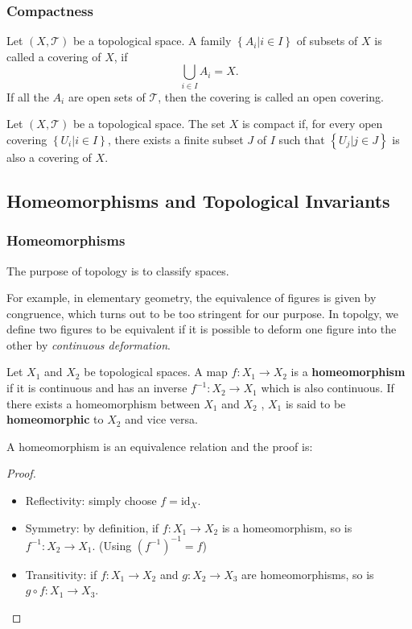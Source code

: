 \documentclass[10pt]{article}
\begin{document}
\subsubsection{Compactness}
\begin{definition}[Covering]
    Let $(X,\mathcal{T})$ be a topological space.
    A family $\left\{A_i\vert i\in I\right\}$ of subsets of $X$ is called a covering of $X$, if 
    \begin{equation}
        \bigcup_{i\in I} A_i=X.
    \end{equation}
    If all the $A_i$ are open sets of $\mathcal{T}$, then the covering is called an open covering.
\end{definition}

\begin{definition}[Compactness]
    Let $(X,\mathcal{T})$ be a topological space.
    The set $X$ is compact if, for every open covering $\left\{U_i\vert i\in I\right\}$, there exists a finite subset $J$ of $I$ such that $\left\{U_j\vert j\in J\right\}$ is also a covering of $X$.
\end{definition}

\subsection{Homeomorphisms and Topological Invariants}
\subsubsection{Homeomorphisms}
\begin{intu}
    The purpose of topology is to classify spaces.
\end{intu}

For example, in elementary geometry, the equivalence of figures is given by congruence, which turns out to be too stringent for our purpose.
In topolgy, we define two figures to be equivalent if it is possible to deform one figure into the other by \textit{continuous deformation}.
\begin{definition}[Homeomorphism]\label{homeomorphism}
    Let $X_1$ and $X_2$ be topological spaces.
    A map $f : X_{1}\to X_{2}$ is a \textbf{homeomorphism} if it is continuous and has an inverse $f^{-1}:X_{2}\to X_{1}$ which is also continuous.
    If there exists a homeomorphism between $X_1$ and $X_2$ , $X_1$ is said to be \textbf{homeomorphic} to $X_2$ and vice versa.
\end{definition}

A homeomorphism is an equivalence relation and the proof is:
\begin{proof}
    \begin{itemize}
        \item Reflectivity: simply choose $f=\text{id}_X$.
        \item Symmetry: by definition, if $f : X_1 \to X_2$ is a homeomorphism, so is $f^{-1} : X_2 \to X_1$. (Using $(f^{-1})^{-1}=f$)
        \item Transitivity: if $f : X_1 \to X_2$ and $g : X_2 \to X_3$ are homeomorphisms, so is $g\circ f : X_1\rightarrow X_3$.
    \end{itemize}
\end{proof}
\end{document}
